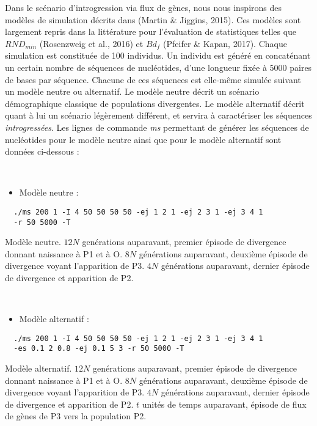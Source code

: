 \documentclass[12pt,twoside]{reedthesis}
\providecommand{\tightlist}{%
  \setlength{\itemsep}{0pt}\setlength{\parskip}{0pt}}
\begin{document}
  Dans le scénario d'introgression via flux de gènes, nous nous inspirons
  des modèles de simulation décrits dans (Martin \& Jiggins, 2015). Ces
  modèles sont largement repris dans la littérature pour l'évaluation de
  statistiques telles que \(RND_{min}\) (Rosenzweig et al., 2016) et
  \(Bd_f\) (Pfeifer \& Kapan, 2017). Chaque simulation est constituée de
  100 individus. Un individu est généré en concaténant un certain nombre
  de séquences de nucléotides, d'une longueur fixée à 5000 paires de bases
  par séquence. Chacune de ces séquences est elle-même simulée suivant un
  modèle neutre ou alternatif. Le modèle neutre décrit un scénario
  démographique classique de populations divergentes. Le modèle alternatif
  décrit quant à lui un scénario légèrement différent, et servira à
  caractériser les séquences \emph{introgressées}. Les lignes de commande
  \emph{ms} permettant de générer les séquences de nucléotides pour le
  modèle neutre ainsi que pour le modèle alternatif sont données
  ci-dessous :
  
  ~
  
  \begin{itemize}
  \tightlist
  \item
    Modèle neutre :
  \end{itemize}
  
  \begin{verbatim}
  ./ms 200 1 -I 4 50 50 50 50 -ej 1 2 1 -ej 2 3 1 -ej 3 4 1 
  -r 50 5000 -T 
  \end{verbatim}
  
  Modèle neutre. \(12N\) genérations auparavant, premier épisode de
  divergence donnant naissance à P1 et à O. \(8N\) générations auparavant,
  deuxième épisode de divergence voyant l'apparition de P3. \(4N\)
  générations auparavant, dernier épisode de divergence et apparition de
  P2.
  
  ~
  
  \begin{itemize}
  \tightlist
  \item
    Modèle alternatif :
  \end{itemize}
  
  \begin{verbatim}
  ./ms 200 1 -I 4 50 50 50 50 -ej 1 2 1 -ej 2 3 1 -ej 3 4 1 
  -es 0.1 2 0.8 -ej 0.1 5 3 -r 50 5000 -T
  \end{verbatim}
  
  Modèle alternatif. \(12N\) genérations auparavant, premier épisode de
  divergence donnant naissance à P1 et à O. \(8N\) générations auparavant,
  deuxième épisode de divergence voyant l'apparition de P3. \(4N\)
  générations auparavant, dernier épisode de divergence et apparition de
  P2. \(t\) unités de temps auparavant, épisode de flux de gènes de P3
  vers la population P2.
  
\end{document}
